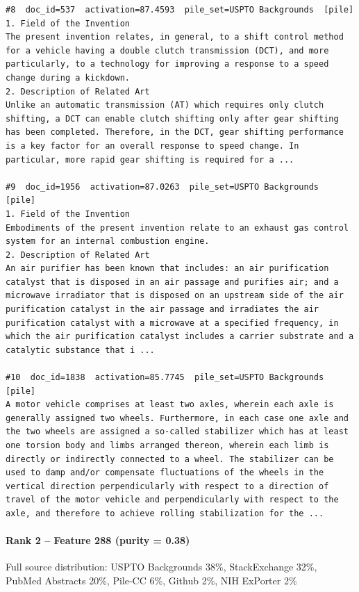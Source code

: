 \begin{verbatim}
#8  doc_id=537  activation=87.4593  pile_set=USPTO Backgrounds  [pile]
1. Field of the Invention
The present invention relates, in general, to a shift control method for a vehicle having a double clutch transmission (DCT), and more particularly, to a technology for improving a response to a speed change during a kickdown.
2. Description of Related Art
Unlike an automatic transmission (AT) which requires only clutch shifting, a DCT can enable clutch shifting only after gear shifting has been completed. Therefore, in the DCT, gear shifting performance is a key factor for an overall response to speed change. In particular, more rapid gear shifting is required for a ...

#9  doc_id=1956  activation=87.0263  pile_set=USPTO Backgrounds  [pile]
1. Field of the Invention
Embodiments of the present invention relate to an exhaust gas control system for an internal combustion engine.
2. Description of Related Art
An air purifier has been known that includes: an air purification catalyst that is disposed in an air passage and purifies air; and a microwave irradiator that is disposed on an upstream side of the air purification catalyst in the air passage and irradiates the air purification catalyst with a microwave at a specified frequency, in which the air purification catalyst includes a carrier substrate and a catalytic substance that i ...

#10  doc_id=1838  activation=85.7745  pile_set=USPTO Backgrounds  [pile]
A motor vehicle comprises at least two axles, wherein each axle is generally assigned two wheels. Furthermore, in each case one axle and the two wheels are assigned a so-called stabilizer which has at least one torsion body and limbs arranged thereon, wherein each limb is directly or indirectly connected to a wheel. The stabilizer can be used to damp and/or compensate fluctuations of the wheels in the vertical direction perpendicularly with respect to a direction of travel of the motor vehicle and perpendicularly with respect to the axle, and therefore to achieve rolling stabilization for the ...

\end{verbatim}

\paragraph*{Rank 2 -- Feature 288 (purity = 0.38)}

Full source distribution: USPTO Backgrounds 38\%, StackExchange 32\%, PubMed Abstracts 20\%, Pile-CC 6\%, Github 2\%, NIH ExPorter 2\%

